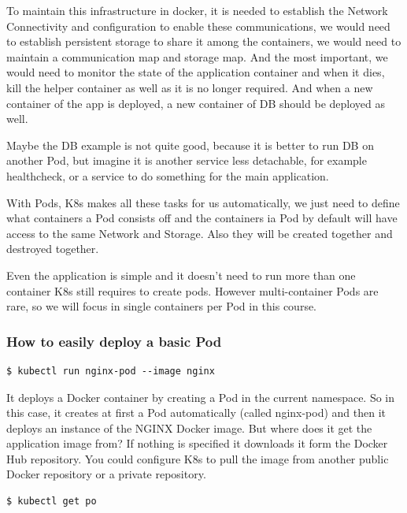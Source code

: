 \documentclass{article}
\newenvironment{blocktemplateI}[1]{%
    \tcolorbox[beamer,%
    noparskip,breakable,
    colframe=Violet,%
    colbacklower=Black,%
    title=#1]}%
    {\endtcolorbox}
\newenvironment{codetemplate}[1][]{%
  \mybasecolorbox[#1]
  \itshape
}{%
  \endmybasecolorbox
}
\begin{document}
To maintain this infrastructure in docker, it is needed to establish the Network Connectivity and configuration to enable these communications, we would need to establish persistent storage to share it among the containers, we would need to maintain a communication map and storage map. And the most important, we would need to monitor the state of the application container and when it dies, kill the helper container as well as it is no longer required. And when a new container of the app is deployed, a new container of DB should be deployed as well.

\begin{blocktemplateI}{Note}
Maybe the DB example is not quite good, because it is better to run DB on another Pod, but imagine it is another service less detachable, for example healthcheck, or a service to do something for the main application.
\end{blocktemplateI}

With Pods, K8s makes all these tasks for us automatically, we just need to define what containers a Pod consists off and the containers ia Pod by default will have access to the same Network and Storage. Also they will be created together and destroyed together.

Even the application is simple and it doesn't need to run more than one container K8s still requires to create pods. However multi-container Pods are rare, so we will focus in single containers per Pod in this course.

\subsubsection{How to easily deploy a basic Pod}

\begin{codetemplate}{}
\begin{verbatim}
$ kubectl run nginx-pod --image nginx
\end{verbatim}
\end{codetemplate}

It deploys a Docker container by creating a Pod in the current namespace. So in this case, it creates at first a Pod automatically (called nginx-pod) and then it deploys an instance of the NGINX Docker image. But where does it get the application image from? If nothing is specified it downloads it form the Docker Hub repository. You could configure K8s to pull the image from another public Docker repository or a private repository.


\begin{codetemplate}{}
\begin{verbatim}
$ kubectl get po
\end{verbatim}
\end{codetemplate}
\end{document}
